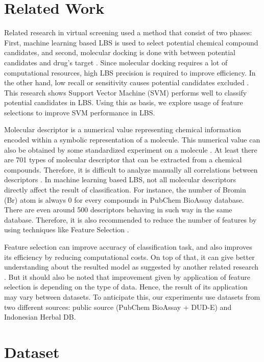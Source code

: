 \documentclass[conference,compsoc,12pt]{IEEEtran}
\begin{document}
	\section{Related Work}
	
	Related research in virtual screening used a method that consist of two phases: First, machine learning based LBS is used to select potential chemical compound candidates, and second, molecular docking is done with between potential candidates and drug's target \cite{hilman2012analisis}. Since molecular docking requires a lot of computational resources, high LBS precision is required to improve efficiency. In the other hand, low recall or sensitivity causes potential candidates excluded \cite{korkmaz2014drug}. This research shows Support Vector Machine (SVM) performs well to classify potential candidates in LBS. Using this as basis, we explore usage of feature selections to improve SVM performance in LBS.
	
	Molecular descriptor is a numerical value representing chemical information encoded within a symbolic representation of a molecule. This numerical value can also be obtained by some standardized experiment on a molecule \cite{yap2011padel}. At least there are 701 types of molecular descriptor that can be extracted from a chemical compounds. Therefore, it is difficult to analyze manually all correlations between descriptors \cite{korkmaz2014drug}. In machine learning based LBS, not all molecular descriptors directly affect the result of classification. For instance, the number of Bromin (Br) atom is always 0 for every compounds in PubChem BioAssay database. There are even around 500 descriptors behaving in such way in the same database. Therefore, it is also recommended to reduce the number of features by using techniques like Feature Selection \cite{korkmaz2014drug}.
	
	Feature selection can improve accuracy of classification task, and also improves its efficiency by reducing computational costs. On top of that, it can give better understanding about the resulted model as suggested by another related research \cite{janecek2008relationship}. But it should also be noted that improvement given by application of feature selection is depending on the type of data. Hence, the result of its application may vary between datasets\cite{janecek2008relationship}. To anticipate this, our experiments use datasets from two different sources: public source (PubChem BioAssay + DUD-E) and Indonesian Herbal DB.
	
	\section{Dataset} \label{Dataset}
	
\end{document}
